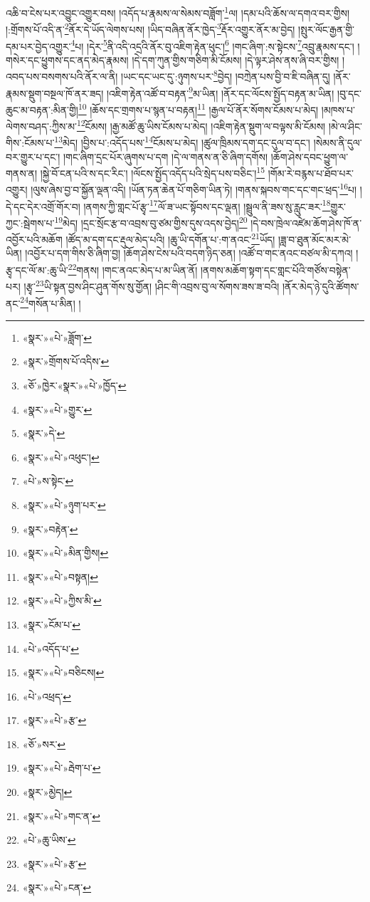 འཆི་བ་ངེས་པར་འབྱུང་འགྱུར་བས། །འདོད་པ་རྣམས་ལ་སེམས་བཟློག་\footnote{«སྣར་»«པེ་»ཟློག་}ལ། །དམ་པའི་ཆོས་ལ་དགའ་བར་གྱིས། །:གྲོགས་པོ་འདི་ན་\footnote{«སྣར་»གྲོགས་པོ་འདིས་}ནོར་དེ་ཡོད་ལེགས་པས། །ཡིད་བཞིན་ནོར་ཁྱེད་\footnote{«ཅོ་»ཁྱེར་«སྣར་»«པེ་»ཁྱོད་}རྡོར་འགྱུར་ནོར་མ་བྱེད། །སྤུར་ལོང་རྒྱན་གྱི་དམ་པར་བྱེད་འགྱུར་\footnote{«སྣར་»«པེ་»གྱུར་}པ། །དེར་\footnote{«སྣར་»དེ་}ནི་འདི་འདྲའི་ནོར་བུ་འཇིག་རྟེན་ཕུང་།\footnote{«སྣར་»«པེ་»འཕུང་།} །གང་ཞིག་:ས་སྟེངས་\footnote{«པེ་»ས་སྟེང་}འབྲུ་རྣམས་དང་། །གསེར་དང་ཕྱུགས་དང་ནད་མེད་རྣམས། །དེ་དག་ཀུན་གྱིས་གཅིག་མི་ངོམས། །དེ་ལྟར་ཤེས་ནས་ཞི་བར་གྱིས། །འབད་པས་བསགས་པའི་ནོར་ལ་ནི། །ཡང་དང་ཡང་དུ་:ཉུགས་པར་\footnote{«སྣར་»«པེ་»ཉུག་པར་}བྱེད། །བཀྲེན་པས་བྱི་བ་ཇི་བཞིན་དུ། །ནོར་རྣམས་སྡུག་བསྔལ་ཁོ་ནར་ཟད། །འཇིག་རྟེན་འཚོ་བ་བརྟན་\footnote{«སྣར་»བརྟེན་}མ་ཡིན། །ནོར་དང་ལོངས་སྤྱོད་བརྟན་མ་ཡིན། །བུ་དང་ཆུང་མ་བརྟན་:མིན་གྱི།\footnote{«སྣར་»«པེ་»མིན་གྱིས།} །ཆོས་དང་གྲགས་པ་སྙན་པ་བརྟན།\footnote{«སྣར་»«པེ་»བསྟན།} །རྒྱལ་པོ་ནོར་སོགས་ངོམས་པ་མེད། །མཁས་པ་ལེགས་བཤད་:ཀྱིས་མ་\footnote{«སྣར་»«པེ་»ཀྱིས་མི་}ངོམས། །རྒྱ་མཚོ་ཆུ་ཡིས་ངོམས་པ་མེད། །འཇིག་རྟེན་སྡུག་ལ་བལྟས་མི་ངོམས། །མེ་ལ་ཤིང་གིས་:ངོམས་པ་\footnote{«སྣར་»ངོམ་པ་}མེད། །བྱིས་པ་:འདོད་པས་\footnote{«པེ་»འདོད་པ་}ངོམས་པ་མེད། །ཚུལ་ཁྲིམས་དག་དང་དུལ་བ་དང་། །སེམས་ནི་དུལ་བར་གྱུར་པ་དང་། །གང་ཞིག་དྲང་པོར་ཞུགས་པ་དག །དེ་ལ་གནས་ན་ཅི་ཞིག་དགོས། །ཆོག་ཤེས་དབང་ཕྱུག་ལ་གནས་ན། །སྐྱེ་བོ་ངན་པའི་ས་དང་རིང་། །ལོངས་སྤྱོད་འདོད་པའི་སྲེད་པས་བཅིང་།\footnote{«སྣར་»«པེ་»བཅིངས།} །གོམ་རེ་བརྙས་པ་ཐོབ་པར་འགྱུར། །ལུས་ཞེས་བྱ་བ་སྐྱོན་ལྡན་འདི། །ཡོན་ཏན་ཆེན་པོ་གཅིག་ཡིན་ཏེ། །གནས་སྐབས་གང་དང་གང་ཕྲད་\footnote{«པེ་»འཕྲད་}པ། །དེ་དང་དེར་འགྲོ་གོར་བ། །ནགས་ཀྱི་གླང་པོ་རྩྭ་\footnote{«སྣར་»«པེ་»རྩ་}ལོ་ཟ་ཡང་སྟོབས་དང་ལྡན། །སྦྲུལ་ནི་ཟས་སུ་རླུང་ཟར་\footnote{«ཅོ་»སར་}གྱུར་ཀྱང་:སྦེགས་པ་\footnote{«སྣར་»«པེ་»རྦེག་པ་}མེད། །དྲང་སྲོང་རྩ་བ་འབྲས་བུ་ཙམ་གྱིས་དུས་འདས་བྱེད།\footnote{«སྣར་»མྱེད།} །དེ་བས་ཁྲེལ་འཛེམ་ཆོག་ཤེས་ཁོ་ན་འབྱོར་པའི་མཆོག །ཚོད་མ་དག་དང་རྡུལ་མེད་པའི། །ཆུ་ཡི་དགོན་པ་:ག་ནའང་\footnote{«སྣར་»«པེ་»གང་ན་}ཡོད། །ཟླ་བ་ཐུན་མོང་མར་མེ་ཡིན། །འབྱོར་པ་དག་གིས་ཅི་ཞིག་བྱ། །ཆོག་ཤེས་ངེས་པའི་བདག་ཉིད་ཅན། །འཚོ་བ་གང་ནའང་བཙལ་མི་དཀའ། །རྩྭ་དང་ལོ་མ་:ཆུ་ཡི་\footnote{«པེ་»ཆུ་ཡིས་}གནས། །གང་ནའང་མེད་པ་མ་ཡིན་ནོ། །ནགས་མཆོག་སྟག་དང་གླང་པོའི་གཙོས་བསྟེན་པར། །རྩྭ་\footnote{«སྣར་»«པེ་»རྩ་}ཡི་སྟན་བྱས་ཤིང་ཤུན་གོས་སུ་གྱོན། །ཤིང་གི་འབྲས་བུ་ལ་སོགས་ཟས་ཟ་བའི། །ནོར་མེད་ཉེ་དུའི་ཚོགས་ནང་\footnote{«སྣར་»«པེ་»ངན་}གསོན་པ་མིན། །
